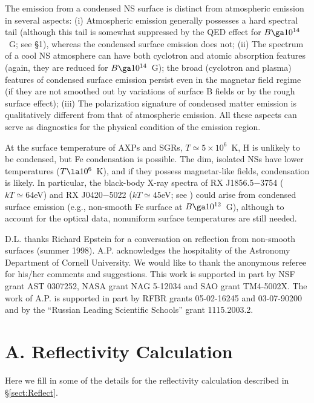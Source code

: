 \documentclass{emulateapj}
\begin{document}
The emission from a condensed NS surface is distinct from atmospheric
emission in several aspects: (i) Atmospheric emission
generally possesses a hard spectral tail (although this tail is 
somewhat suppressed by the QED effect for $B\ga 10^{14}$~G; see \S1), 
whereas the condensed surface emission does not;
(ii) The spectrum of a cool NS atmosphere can have both cyclotron and
atomic absorption features (again, they are reduced for 
$B\ga 10^{14}$~G); the broad (cyclotron and plasma) features of 
condensed surface emission persist even in the magnetar field regime
(if they are not smoothed out by variations of surface B fields or 
by the rough surface effect);
(iii) The polarization signature of condensed matter emission 
is qualitatively different from that of atmospheric emission.
All these aspects can serve as diagnostics for the physical condition 
of the emission region.

At the surface temperature of AXPs and SGRs, $T\simeq 5\times 10^6$~K, 
H is unlikely to be condensed, but Fe condensation is possible.
The dim, isolated NSs have lower temperatures ($T\la 10^6$~K),
and if they possess magnetar-like fields, condensation is likely.
In particular, the black-body X-ray spectra of RX J1856.5$-$3754 ($kT\simeq 64$eV) 
and RX J0420$-$5022 ($kT\simeq 45$eV; see \citealt{Haberl-ea04b})
could arise from condensed surface emission (e.g., 
non-smooth Fe surface at $B\ga 10^{12}$~G), although to
account for the optical data, nonuniform surface temperatures are still 
needed. 



\acknowledgements
D.L. thanks Richard Epstein for a conversation on reflection from
non-smooth surfaces (summer 1998).
A.P. acknowledges the hospitality
of the Astronomy Department of Cornell University.
We would like to thank the anonymous referee for his/her 
comments and suggestions.
This work is supported in part by 
NSF grant AST 0307252, NASA grant NAG 5-12034 and SAO grant TM4-5002X.
The work of A.P. is supported in part by
RFBR grants 05-02-16245 and 03-07-90200
and by the ``Russian Leading Scientific Schools'' grant 1115.2003.2.

\appendix
\section{A. Reflectivity Calculation}
\label{sect:A}

Here we fill in some of the details for the reflectivity 
calculation described in \S\ref{sect:Reflect}. 
\end{document}
